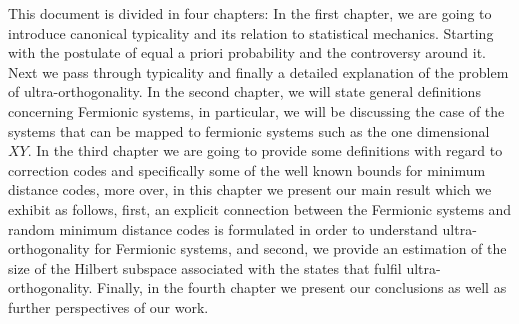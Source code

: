 



 


\indent This document is divided in four chapters: In the first chapter, we are going to introduce canonical typicality and its relation to statistical mechanics. Starting with the postulate of equal a priori probability and the controversy around it. Next we pass through typicality and finally a detailed explanation of the problem of ultra-orthogonality. In the second chapter, we will state general definitions concerning Fermionic systems, in particular, we will be discussing the case of the systems that can be mapped to fermionic systems such as the one dimensional $XY$. In the third chapter we are going to provide some definitions with regard to correction codes and specifically some of the well known bounds for minimum distance codes, more over, in this chapter we present our main result which we exhibit as follows, first, an explicit connection between the Fermionic systems and random minimum distance codes is formulated in order to understand ultra-orthogonality for Fermionic systems, and second, we provide an estimation of the size of the Hilbert subspace associated with the states that fulfil ultra-orthogonality. Finally, in the fourth chapter we present our conclusions as well as further perspectives of our work.


